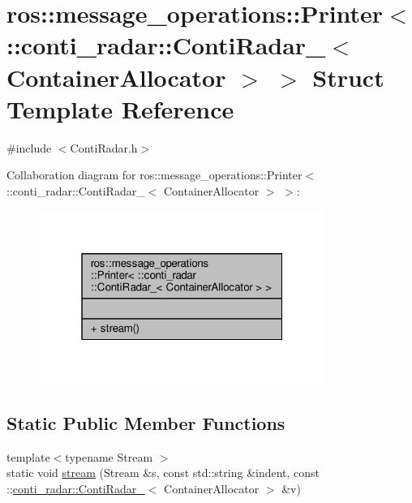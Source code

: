 \hypertarget{structros_1_1message__operations_1_1Printer_3_01_1_1conti__radar_1_1ContiRadar___3_01ContainerAllocator_01_4_01_4}{}\section{ros\+:\+:message\+\_\+operations\+:\+:Printer$<$ \+:\+:conti\+\_\+radar\+:\+:Conti\+Radar\+\_\+$<$ Container\+Allocator $>$ $>$ Struct Template Reference}
\label{structros_1_1message__operations_1_1Printer_3_01_1_1conti__radar_1_1ContiRadar___3_01ContainerAllocator_01_4_01_4}


{\ttfamily \#include $<$Conti\+Radar.\+h$>$}



Collaboration diagram for ros\+:\+:message\+\_\+operations\+:\+:Printer$<$ \+:\+:conti\+\_\+radar\+:\+:Conti\+Radar\+\_\+$<$ Container\+Allocator $>$ $>$\+:\nopagebreak
\begin{figure}[H]
\begin{center}
\leavevmode
\includegraphics[width=265pt]{d4/d78/structros_1_1message__operations_1_1Printer_3_01_1_1conti__radar_1_1ContiRadar___3_01ContainerAllocator_01_4_01_4__coll__graph}
\end{center}
\end{figure}
\subsection*{Static Public Member Functions}
\begin{DoxyCompactItemize}
\item 
{\footnotesize template$<$typename Stream $>$ }\\static void \hyperlink{structros_1_1message__operations_1_1Printer_3_01_1_1conti__radar_1_1ContiRadar___3_01ContainerAllocator_01_4_01_4_a6a51c80723a074fd1087c53ce05d3b3a}{stream} (Stream \&s, const std\+::string \&indent, const \+::\hyperlink{structconti__radar_1_1ContiRadar__}{conti\+\_\+radar\+::\+Conti\+Radar\+\_\+}$<$ Container\+Allocator $>$ \&v)
\end{DoxyCompactItemize}


